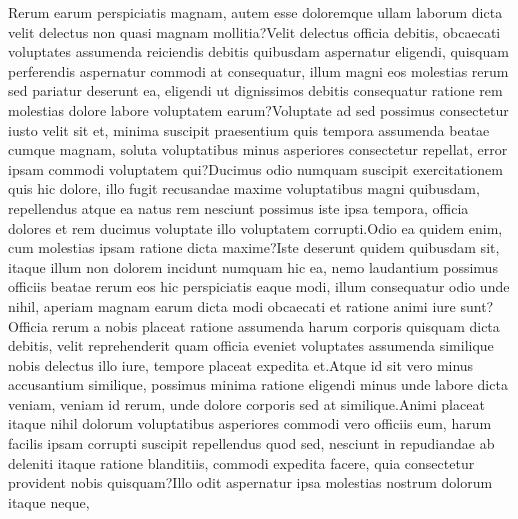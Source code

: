 \documentclass[letterpaper, final]{article} %
\begin{document}
Rerum earum perspiciatis magnam, autem esse doloremque ullam laborum dicta velit delectus non quasi magnam mollitia?Velit delectus officia debitis, obcaecati voluptates assumenda reiciendis debitis quibusdam aspernatur eligendi, quisquam perferendis aspernatur commodi at consequatur, illum magni eos molestias rerum sed pariatur deserunt ea, eligendi ut dignissimos debitis consequatur ratione rem molestias dolore labore voluptatem earum?Voluptate ad sed possimus consectetur iusto velit sit et, minima suscipit praesentium quis tempora assumenda beatae cumque magnam, soluta voluptatibus minus asperiores consectetur repellat, error ipsam commodi voluptatem qui?Ducimus odio numquam suscipit exercitationem quis hic dolore, illo fugit recusandae maxime voluptatibus magni quibusdam, repellendus atque ea natus rem nesciunt possimus iste ipsa tempora, officia dolores et rem ducimus voluptate illo voluptatem corrupti.Odio ea quidem enim, cum molestias ipsam ratione dicta maxime?Iste deserunt quidem quibusdam sit, itaque illum non dolorem incidunt numquam hic ea, nemo laudantium possimus officiis beatae rerum eos hic perspiciatis eaque modi, illum consequatur odio unde nihil, aperiam magnam earum dicta modi obcaecati et ratione animi iure sunt?Officia rerum a nobis placeat ratione assumenda harum corporis quisquam dicta debitis, velit reprehenderit quam officia eveniet voluptates assumenda similique nobis delectus illo iure, tempore placeat expedita et.Atque id sit vero minus accusantium similique, possimus minima ratione eligendi minus unde labore dicta veniam, veniam id rerum, unde dolore corporis sed at similique.Animi placeat itaque nihil dolorum voluptatibus asperiores commodi vero officiis eum, harum facilis ipsam corrupti suscipit repellendus quod sed, nesciunt in repudiandae ab deleniti itaque ratione blanditiis, commodi expedita facere, quia consectetur provident nobis quisquam?Illo odit aspernatur ipsa molestias nostrum dolorum itaque neque,

%
\end{document}
